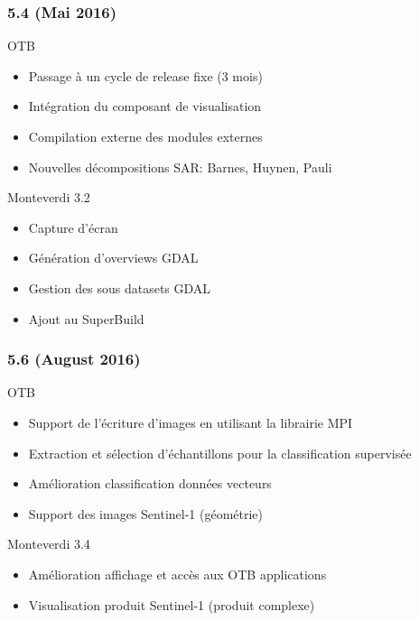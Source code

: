 \documentclass[8pt]{beamer}
\begin{document}
\begin{frame}
\frametitle{5.4 (Mai 2016)}
\begin{block}{OTB}
\begin{itemize}
\item Passage à un cycle de release fixe (3 mois)
\item Intégration du composant de visualisation
\item Compilation externe des modules externes
\item Nouvelles décompositions SAR: Barnes, Huynen, Pauli
\end{itemize}
\end{block}

\begin{block}{Monteverdi 3.2}
\begin{itemize}
\item Capture d'écran
\item Génération d'overviews GDAL
\item Gestion des sous datasets GDAL
\item Ajout au SuperBuild
\end{itemize}
\end{block}
\end{frame}

\begin{frame}
\frametitle{5.6 (August 2016)}
\begin{block}{OTB}
\begin{itemize}
\item Support de l'écriture d'images en utilisant la librairie MPI
\item Extraction et sélection d'échantillons pour la classification supervisée
\item Amélioration classification données vecteurs
\item Support des images Sentinel-1 (géométrie)
\end{itemize}
\end{block}

\begin{block}{Monteverdi 3.4}
\begin{itemize}
\item Amélioration affichage et accès aux OTB applications
\item Visualisation produit Sentinel-1 (produit complexe)
\end{itemize}
\end{block}
\end{frame}
\end{document}
